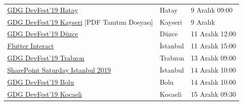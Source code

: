 \documentclass[11pt]{article}
\begin{document}
\begin{longtable}{|p{8cm}|l|l|}
\href{https://www.meetup.com/tr-TR/GDG-Hatay/events/265309353/}{GDG DevFest'19 Hatay} & Hatay & 9 Aralık 09:00\\
\href{https://gdgkayseri.com/tanitim-dosyasi.pdf}{GDG DevFest'19 Kayseri} [PDF Tanıtım Dosyası] & Kayseri & 9 Aralık\\
\href{https://www.meetup.com/tr-TR/GDG-Duzce-Meetup/events/263335030/}{GDG DevFest'19 Düzce} & Düzce & 11 Aralık 12:00\\
\href{https://kommunity.com/dsc-istinye/events/flutter-interact}{Flutter Interact} & İstanbul & 11 Aralık 15:00\\
\href{https://www.meetup.com/tr-TR/GDGTrabzon/events/265973568/}{GDG DevFest'19 Trabzon} & Trabzon & 13 Aralık 09:00\\
\href{https://kommunity.com/sharepoint/events/sharepoint-saturday-istanbul-2019}{SharePoint Saturday Istanbul 2019} & İstanbul & 14 Aralık 10:00\\
\href{https://www.meetup.com/tr-TR/GDGBolu/events/265427159/}{GDG DevFest'19 Bolu} & Bolu & 14 Aralık 10:00\\
\href{http://devfest.gdgkocaeli.com/}{GDG DevFest'19 Kocaeli} & Kocaeli & 15 Aralık 09:30\\
\hline
\end{longtable}
\end{document}
